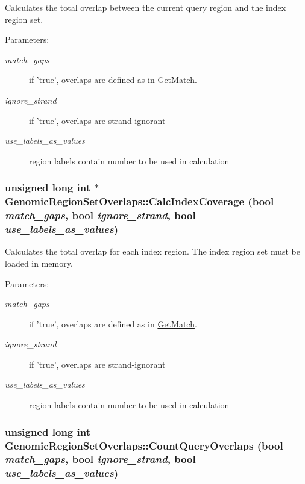 Calculates the total overlap between the current query region and the index region set. 

\begin{Desc}
\item[Parameters:]
\begin{description}
\item[{\em match\_\-gaps}]if 'true', overlaps are defined as in \hyperlink{classGenomicRegionSetOverlaps_e6d1c3bd67b0a902649aab01909a9c10}{GetMatch}. \item[{\em ignore\_\-strand}]if 'true', overlaps are strand-ignorant \item[{\em use\_\-labels\_\-as\_\-values}]region labels contain number to be used in calculation \end{description}
\end{Desc}
\hypertarget{classGenomicRegionSetOverlaps_5c31081b154c624ba35487d988082ffa}{
\subsubsection[CalcIndexCoverage]{\setlength{\rightskip}{0pt plus 5cm}unsigned long int $\ast$ GenomicRegionSetOverlaps::CalcIndexCoverage (bool {\em match\_\-gaps}, \/  bool {\em ignore\_\-strand}, \/  bool {\em use\_\-labels\_\-as\_\-values})}}
\label{classGenomicRegionSetOverlaps_5c31081b154c624ba35487d988082ffa}


Calculates the total overlap for each index region. The index region set must be loaded in memory. 

\begin{Desc}
\item[Parameters:]
\begin{description}
\item[{\em match\_\-gaps}]if 'true', overlaps are defined as in \hyperlink{classGenomicRegionSetOverlaps_e6d1c3bd67b0a902649aab01909a9c10}{GetMatch}. \item[{\em ignore\_\-strand}]if 'true', overlaps are strand-ignorant \item[{\em use\_\-labels\_\-as\_\-values}]region labels contain number to be used in calculation \end{description}
\end{Desc}
\hypertarget{classGenomicRegionSetOverlaps_012372e8ca88ef24bead47db23ab8ee4}{
\subsubsection[CountQueryOverlaps]{\setlength{\rightskip}{0pt plus 5cm}unsigned long int GenomicRegionSetOverlaps::CountQueryOverlaps (bool {\em match\_\-gaps}, \/  bool {\em ignore\_\-strand}, \/  bool {\em use\_\-labels\_\-as\_\-values})}}
\label{classGenomicRegionSetOverlaps_012372e8ca88ef24bead47db23ab8ee4}


